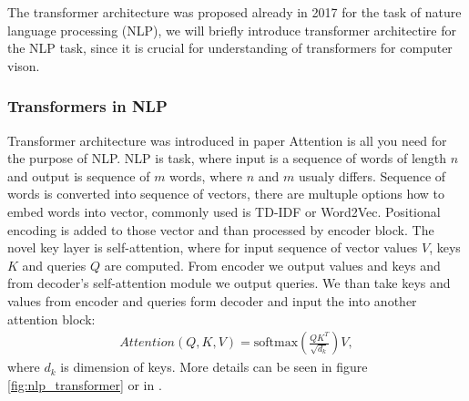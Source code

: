 The transformer architecture was proposed already in 2017 for the task of nature language processing (NLP), we will briefly introduce transformer architectire for the NLP task, since it is crucial for understanding of transformers for computer vison.

\subsubsection{Transformers in NLP}
Transformer architecture was introduced in paper Attention is all you need \cite{Vaswani2017} for the purpose of NLP. NLP is task, where input is a sequence of words of length $n$ and output is sequence of $m$ words, where $n$ and $m$ usualy differs. Sequence of words is converted into sequence of vectors, there are multuple options how to embed words into vector, commonly used is TD-IDF or Word2Vec\cite{Li2018}. Positional encoding is added to those vector and than processed by encoder block. The novel key layer is self-attention, where for input sequence of vector values $V$, keys $K$ and queries $Q$ are computed. From encoder we output values and keys and from decoder's self-attention module we output queries. We than take keys and values from encoder and queries form decoder and input the into another attention block:
\begin{align}
    Attention \left(Q,K,V \right) = \text{softmax} \left( \frac{QK^T}{\sqrt{d_k}} \right)V,
\end{align}
where $d_k$ is dimension of keys. More details can be seen in figure \ref{fig:nlp_transformer} or in \cite{Vaswani2017}.

